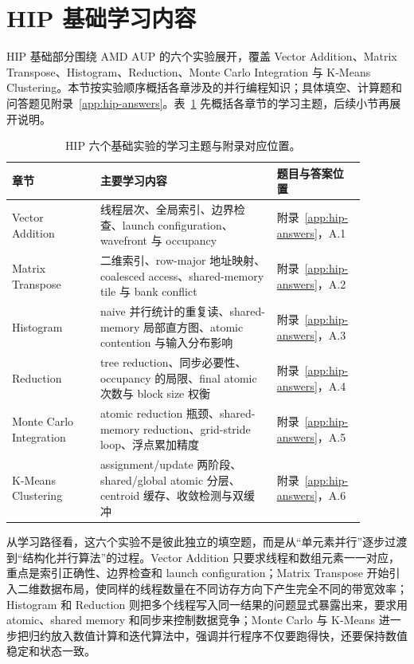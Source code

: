 \documentclass[10pt,a4paper]{article}
\begin{document}
\section{HIP 基础学习内容}

HIP 基础部分围绕 AMD AUP 的六个实验展开，覆盖 Vector Addition、Matrix Transpose、Histogram、Reduction、Monte Carlo Integration 与 K-Means Clustering。本节按实验顺序概括各章涉及的并行编程知识；具体填空、计算题和问答题见附录~\ref{app:hip-answers}。表~\ref{tab:hip-learning-map} 先概括各章节的学习主题，后续小节再展开说明。

\begin{table}[H]
\centering
\small
\caption{HIP 六个基础实验的学习主题与附录对应位置。}
\label{tab:hip-learning-map}
\begin{tabular}{p{0.22\linewidth}p{0.44\linewidth}p{0.22\linewidth}}
\toprule
章节 & 主要学习内容 & 题目与答案位置 \\
\midrule
Vector Addition & 线程层次、全局索引、边界检查、launch configuration、wavefront 与 occupancy & 附录~\ref{app:hip-answers}，A.1 \\
Matrix Transpose & 二维索引、row-major 地址映射、coalesced access、shared-memory tile 与 bank conflict & 附录~\ref{app:hip-answers}，A.2 \\
Histogram & naive 并行统计的重复读、shared-memory 局部直方图、atomic contention 与输入分布影响 & 附录~\ref{app:hip-answers}，A.3 \\
Reduction & tree reduction、同步必要性、occupancy 的局限、final atomic 次数与 block size 权衡 & 附录~\ref{app:hip-answers}，A.4 \\
Monte Carlo Integration & atomic reduction 瓶颈、shared-memory reduction、grid-stride loop、浮点累加精度 & 附录~\ref{app:hip-answers}，A.5 \\
K-Means Clustering & assignment/update 两阶段、shared/global atomic 分层、centroid 缓存、收敛检测与双缓冲 & 附录~\ref{app:hip-answers}，A.6 \\
\bottomrule
\end{tabular}
\end{table}

从学习路径看，这六个实验不是彼此独立的填空题，而是从“单元素并行”逐步过渡到“结构化并行算法”的过程。Vector Addition 只要求线程和数组元素一一对应，重点是索引正确性、边界检查和 launch configuration；Matrix Transpose 开始引入二维数据布局，使同样的线程数量在不同访存方向下产生完全不同的带宽效率；Histogram 和 Reduction 则把多个线程写入同一结果的问题显式暴露出来，要求用 atomic、shared memory 和同步来控制数据竞争；Monte Carlo 与 K-Means 进一步把归约放入数值计算和迭代算法中，强调并行程序不仅要跑得快，还要保持数值稳定和状态一致。
\end{document}
